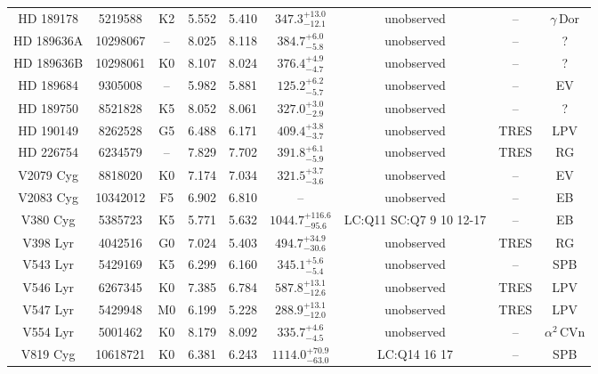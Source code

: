 \begin{table*}
\begin{tabular}{ccccccccc}
HD 189178 & 5219588 & K2 & 5.552 & 5.410 & $347.3^{+13.0}_{-12.1}$ & unobserved & -- & $\gamma\,\text{Dor}$ \\
HD 189636A & 10298067 & -- & 8.025 & 8.118 & $384.7^{+6.0}_{-5.8}$ & unobserved & -- & ? \\
HD 189636B & 10298061 & K0 & 8.107 & 8.024 & $376.4^{+4.9}_{-4.7}$ & unobserved & -- & ? \\
HD 189684 & 9305008 & -- & 5.982 & 5.881 & $125.2^{+6.2}_{-5.7}$ & unobserved & -- & EV \\
HD 189750 & 8521828 & K5 & 8.052 & 8.061 & $327.0^{+3.0}_{-2.9}$ & unobserved & -- & ? \\
HD 190149 & 8262528 & G5 & 6.488 & 6.171 & $409.4^{+3.8}_{-3.7}$ & unobserved & TRES & LPV \\
HD 226754 & 6234579 & -- & 7.829 & 7.702 & $391.8^{+6.1}_{-5.9}$ & unobserved & TRES & RG \\
V2079 Cyg & 8818020 & K0 & 7.174 & 7.034 & $321.5^{+3.7}_{-3.6}$ & unobserved & -- & EV \\
V2083 Cyg & 10342012 & F5 & 6.902 & 6.810 & -- & unobserved & -- & EB \\
V380 Cyg & 5385723 & K5 & 5.771 & 5.632 & $1044.7^{+116.6}_{-95.6}$ & LC:Q11 SC:Q7 9 10 12-17 & -- & EB \\
V398 Lyr & 4042516 & G0 & 7.024 & 5.403 & $494.7^{+34.9}_{-30.6}$ & unobserved & TRES & RG \\
V543 Lyr & 5429169 & K5 & 6.299 & 6.160 & $345.1^{+5.6}_{-5.4}$ & unobserved & -- & SPB \\
V546 Lyr & 6267345 & K0 & 7.385 & 6.784 & $587.8^{+13.1}_{-12.6}$ & unobserved & TRES & LPV \\
V547 Lyr & 5429948 & M0 & 6.199 & 5.228 & $288.9^{+13.1}_{-12.0}$ & unobserved & TRES & LPV \\
V554 Lyr & 5001462 & K0 & 8.179 & 8.092 & $335.7^{+4.6}_{-4.5}$ & unobserved & -- & $\alpha^2\,\text{CVn}$ \\
V819 Cyg & 10618721 & K0 & 6.381 & 6.243 & $1114.0^{+70.9}_{-63.0}$ & LC:Q14 16 17 & -- & SPB \\
\hline
\end{tabular}
\end{table*}
